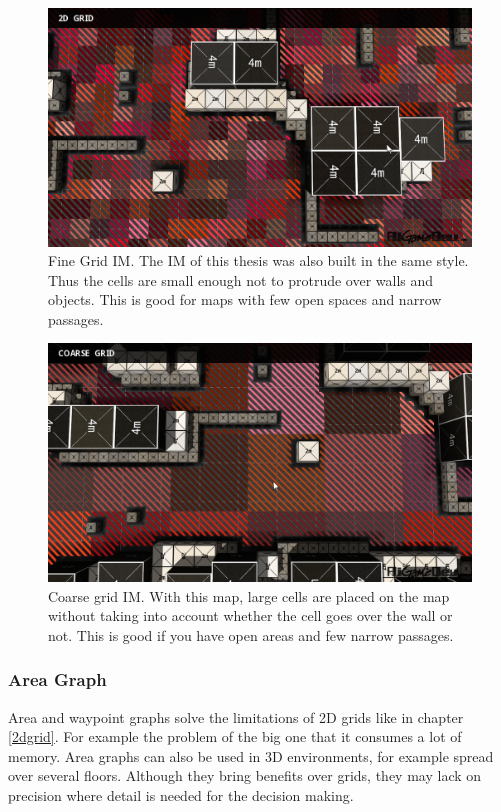 \documentclass[]{report}
\begin{document}
	\begin{figure}[h!]
		\centering
		\includegraphics[width=1\linewidth]{Images/screenshot001_2dGrid}
		\caption[Fine Grid influence map]{Fine Grid \ac{IM}. The \ac{IM} of this thesis was also built in the same style. Thus the cells are small enough not to protrude over walls and objects. This is good for maps with few open spaces and narrow passages. \citep{gameDevInfluenceMap} \citep{imPathfinding}}
		\label{fig:screenshot0012dgrid}
	\end{figure}
	\begin{figure}[h!]
		\centering
		\includegraphics[width=1\linewidth]{Images/screenshot001_2dGrid2}
		\caption[Coarse grid influence map.]{Coarse grid \ac{IM}. With this map, large cells are placed on the map without taking into account whether the cell goes over the wall or not. This is good if you have open areas and few narrow passages. \citep{gameDevInfluenceMap} \citep{imPathfinding}}
		\label{fig:screenshot0012dgrid2}
	\end{figure}
	
	\newpage
	\subsubsection{Area Graph}
	Area and waypoint graphs solve the limitations of 2D grids like in chapter \ref{2dgrid}. For example the problem of the big one that it consumes a lot of memory. Area graphs can also be used in 3D environments, for example spread over several floors. Although they bring benefits over grids, they may lack on precision where detail is needed for the decision making. \citep{gameDevInfluenceMap} \citep{imPathfinding}
	
\end{document}
